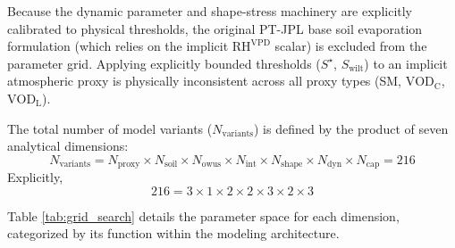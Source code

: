 \documentclass[11pt]{article}
\begin{document}
Because the dynamic parameter and shape-stress machinery are explicitly calibrated to physical thresholds, the original PT-JPL base soil evaporation formulation (which relies on the implicit $\mathrm{RH}^{\mathrm{VPD}}$ scalar) is excluded from the parameter grid. Applying explicitly bounded thresholds ($S^\star$, $S_{\mathrm{wilt}}$) to an implicit atmospheric proxy is physically inconsistent across all proxy types (SM, $\mathrm{VOD}_{\mathrm{C}}$, $\mathrm{VOD}_{\mathrm{L}}$).

The total number of model variants ($N_{\mathrm{variants}}$) is defined by the product of seven analytical dimensions:
\begin{equation}
  N_{\mathrm{variants}} = N_{\mathrm{proxy}} \times N_{\mathrm{soil}} \times N_{\mathrm{owus}} \times N_{\mathrm{int}} \times N_{\mathrm{shape}} \times N_{\mathrm{dyn}} \times N_{\mathrm{cap}} = 216
\end{equation}
Explicitly,
\begin{equation}
  216 = 3 \times 1 \times 2 \times 2 \times 3 \times 2 \times 3
\end{equation}

Table \ref{tab:grid_search} details the parameter space for each dimension, categorized by its function within the modeling architecture.

\begin{table}[h]
\centering
\renewcommand{\arraystretch}{1.3}
\caption{Diagrammatic expansion of the refined combinatorial parameter space.}
\label{tab:grid_search}
\end{table}
\end{document}
